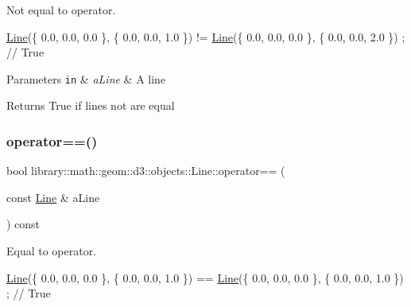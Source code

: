 Not equal to operator. 


\begin{DoxyCode}
\hyperlink{classlibrary_1_1math_1_1geom_1_1d3_1_1objects_1_1_line_a762e529453ff9ffa9233fd73737f4692}{Line}(\{ 0.0, 0.0, 0.0 \}, \{ 0.0, 0.0, 1.0 \}) != \hyperlink{classlibrary_1_1math_1_1geom_1_1d3_1_1objects_1_1_line_a762e529453ff9ffa9233fd73737f4692}{Line}(\{ 0.0, 0.0, 0.0 \}, \{ 0.0, 0.0, 2.0 \}) ; \textcolor{comment}{// True}
\end{DoxyCode}



\begin{DoxyParams}[1]{Parameters}
\mbox{\tt in}  & {\em a\+Line} & A line \\
\hline
\end{DoxyParams}
\begin{DoxyReturn}{Returns}
True if lines not are equal 
\end{DoxyReturn}
\mbox{\label{classlibrary_1_1math_1_1geom_1_1d3_1_1objects_1_1_line_a2e5b0da1d652abbff16d7024f8eecb0a}} 
\subsubsection{\texorpdfstring{operator==()}{operator==()}}
{\footnotesize\ttfamily bool library\+::math\+::geom\+::d3\+::objects\+::\+Line\+::operator== (\begin{DoxyParamCaption}\item[{const \hyperlink{classlibrary_1_1math_1_1geom_1_1d3_1_1objects_1_1_line}{Line} \&}]{a\+Line }\end{DoxyParamCaption}) const}



Equal to operator. 


\begin{DoxyCode}
\hyperlink{classlibrary_1_1math_1_1geom_1_1d3_1_1objects_1_1_line_a762e529453ff9ffa9233fd73737f4692}{Line}(\{ 0.0, 0.0, 0.0 \}, \{ 0.0, 0.0, 1.0 \}) == \hyperlink{classlibrary_1_1math_1_1geom_1_1d3_1_1objects_1_1_line_a762e529453ff9ffa9233fd73737f4692}{Line}(\{ 0.0, 0.0, 0.0 \}, \{ 0.0, 0.0, 1.0 \}) ; \textcolor{comment}{// True}
\end{DoxyCode}



